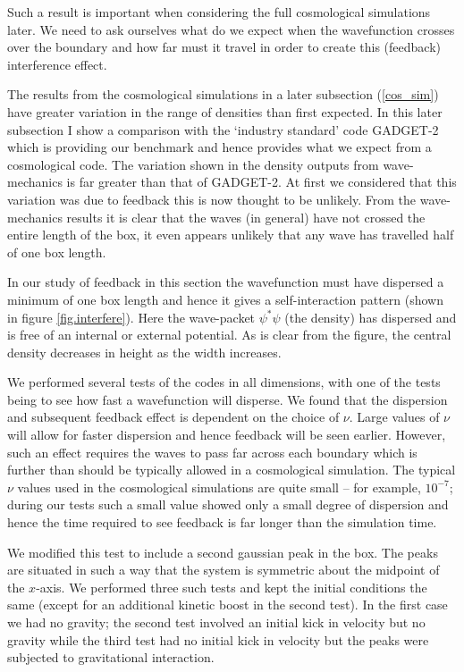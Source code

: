 Such a result is important when considering the full cosmological simulations later. We need to ask ourselves what do we expect when the wavefunction crosses over the boundary and how far must it travel in order to create this (feedback) interference effect.

The results from the cosmological simulations in a later subsection (\ref{cos_sim}) have greater variation in the range of densities than first expected. In this later subsection I show a comparison with the `industry standard' code GADGET-2 which is providing our benchmark and hence provides what we expect from a cosmological code. The variation shown in the density outputs from wave-mechanics is far greater than that of GADGET-2. At first we considered that this variation was due to feedback this is now thought to be unlikely. From the wave-mechanics results it is clear that the waves (in general) have not crossed the entire length of the box, it even appears unlikely that any wave has travelled half of one box length.

In our study of feedback in this section the wavefunction must have dispersed a minimum of one box length and hence it gives a self-interaction pattern (shown in figure \ref{fig.interfere}). Here the wave-packet $\psi^*\psi$ (the density) has dispersed and is free of an internal or external potential. As is clear from the figure, the central density decreases in height as the width increases.

We performed several tests of the codes in all dimensions, with one of the tests being to see how fast a wavefunction will disperse. We found that the dispersion and subsequent feedback effect is dependent on the choice of $\nu$. Large values of $\nu$ will allow for faster dispersion and hence feedback will be seen earlier. However, such an effect requires the waves to pass far across each boundary which is further than should be typically allowed in a cosmological simulation. The typical $\nu$ values used in the cosmological simulations are quite small -- for example, $10^{-7}$; during our tests such a small value showed only a small degree of dispersion and hence the time required to see feedback is far longer than the simulation time.

We modified this test to include a second gaussian peak in the box. The peaks are situated in such a way that the system is symmetric about the midpoint of the $x$-axis. We performed three such tests and kept the initial conditions the same (except for an additional kinetic boost in the second test). In the first case we had no gravity; the second test involved an initial kick in velocity but no gravity while the third test had no initial kick in velocity but the peaks were subjected to gravitational interaction.

